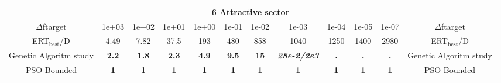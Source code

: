 \begin{tabular}{cccccccccccc}
 & \multicolumn{10}{c}{{\normalsize \textbf{6 Attractive sector}}}\\
$\Delta$ftarget& 1e+03& 1e+02& 1e+01& 1e+00& 1e-01& 1e-02& 1e-03& 1e-04& 1e-05& 1e-07 & $\Delta$ftarget \\
ERT$_{\textrm{best}}$/D& 4.49& 7.82& 37.5& 193& 480& 858& 1040& 1250& 1400& 2980 & ERT$_{\textrm{best}}$/D \\
\hline
Genetic Algoritm study & \textbf{2.2} & \textbf{1.8} & \textbf{2.3} & \textbf{4.9} & \textbf{9.5} & \textbf{15} & \textbf{\textit{28e-2}\textit{/2e3}} & \textbf{.} & \textbf{.} & \textbf{.} & Genetic Algoritm study \cite{add_an_entry_for_Genetic Algoritm study_in_bbob.bib}\\
PSO Bounded & \textbf{1} & \textbf{1} & \textbf{1} & \textbf{1} & \textbf{1} & \textbf{1} & \textbf{1} & \textbf{1} & \textbf{1} & \textbf{1} & PSO Bounded \cite{add_an_entry_for_PSO Bounded_in_bbob.bib}
\end{tabular}
